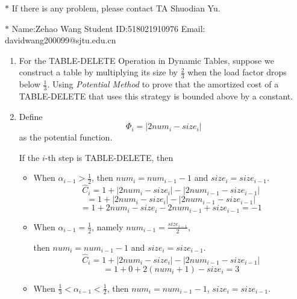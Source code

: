 \documentclass[12pt,a4paper]{article}
\makeatletter
\newtheorem*{solution}{Solution}
\theoremstyle{definition}
\renewenvironment{solution}[1][Solution] {\par\pushQED{\qed}\normalfont\topsep6\p@\@plus6\p@\relax\trivlist\item[\hskip\labelsep\bfseries#1\@addpunct{.}]\ignorespaces}{\popQED\endtrivlist\@endpefalse} \makeatother
\makeatother
\begin{document}
\noindent

\noindent{}
\begin{center}
\footnotesize{\color{red}$*$ If there is any problem, please contact TA Shuodian Yu. }

\footnotesize{\color{blue}$*$ Name:Zehao Wang  \quad Student ID:518021910976 \quad Email: davidwang200099@sjtu.edu.cn}
\end{center}
\begin{enumerate}
	\item For the TABLE-DELETE Operation in Dynamic Tables, suppose we construct a table by multiplying its size by $\frac 23$ when the load factor drops below $\frac 13$. Using \emph{Potential Method} to prove that the amortized cost of a TABLE-DELETE that uses this strategy is bounded above by a constant.
	\begin{solution}
		Define 
		\begin{equation*}
		    \Phi_i=|2num_i-size_i|
		\end{equation*}
		as the potential function.
		
		If the $i$-th step is TABLE-DELETE, then
		\begin{itemize}
			\item 
			    When $\alpha_{i-1}>\frac{1}{2}$, then $num_i=num_{i-1}-1$ and $size_i=size_{i-1}$.
			    \begin{equation*}
			        \hat{C}_i=1+|2num_i-size_i|-|2num_{i-1}-size_{i-1}|
			    \end{equation*}
			    \begin{equation*}
			        =1+|2num_i-size_i|-|2num_{i-1}-size_{i-1}|
			    \end{equation*}
			    \begin{equation*}
			        =1+2num_i-size_i-2num_{i-1}+size_{i-1}=-1
			    \end{equation*}
			\item 
			    When $\alpha_{i-1}=\frac{1}{2}$, namely $num_{i-1}=\frac{size_{i-1}}{2}$, 
			    
			    then $num_i=num_{i-1}-1$ and $size_i=size_{i-1}$.
			    \begin{equation*}
			        \hat{C}_i=1+|2num_i-size_i|-|2num_{i-1}-size_{i-1}|
			    \end{equation*}
			    \begin{equation*}
			        =1+0+2(num_i+1)-size_i=3
			    \end{equation*}
			\item 
			    When $\frac{1}{3}<\alpha_{i-1}<\frac{1}{2}$, then $num_i=num_{i-1}-1$, $size_i=size_{i-1}$.
			    

\end{itemize}
\end{solution}
\end{enumerate}
\end{document}
